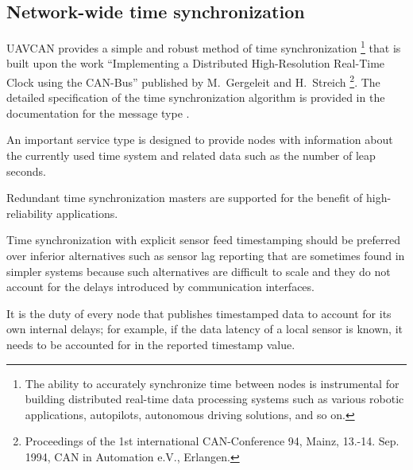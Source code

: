 
\subsection{Network-wide time synchronization}

UAVCAN provides a simple and robust method of time synchronization%
\footnote{The ability to accurately synchronize time between nodes is instrumental for building distributed
real-time data processing systems such as various robotic applications, autopilots, autonomous driving solutions,
and so on.} that is built upon the work
``Implementing a Distributed High-Resolution Real-Time Clock using the CAN-Bus''
published by M.~Gergeleit and H.~Streich%
\footnote{Proceedings of the 1st international CAN-Conference 94, Mainz,
13.-14. Sep. 1994, CAN in Automation e.V., Erlangen.}.
The detailed specification of the time synchronization algorithm is provided in the documentation
for the message type .

An important service type 
is designed to provide nodes with information about the currently used time system
and related data such as the number of leap seconds.

Redundant time synchronization masters are supported for the benefit of high-reliability applications.

\begin{remark}
      Time synchronization with explicit sensor feed timestamping should be preferred over inferior alternatives
      such as sensor lag reporting that are sometimes found in simpler systems because such alternatives
      are difficult to scale and they do not account for the delays introduced by communication interfaces.

      It is the duty of every node that publishes timestamped data to account for its own internal delays;
      for example, if the data latency of a local sensor is known,
      it needs to be accounted for in the reported timestamp value.
\end{remark}


